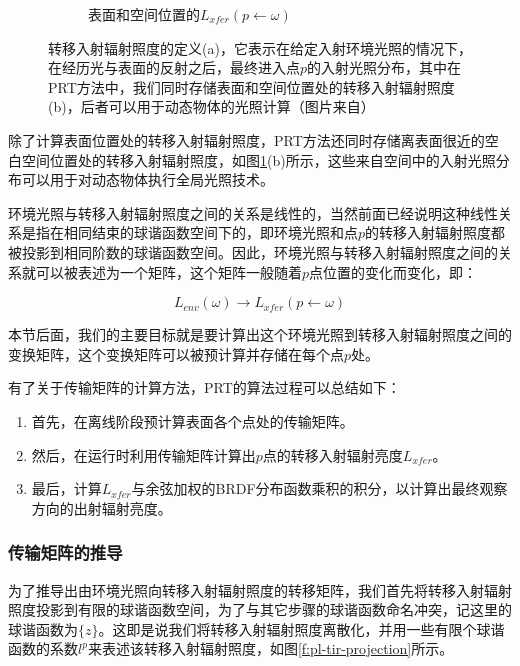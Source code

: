 \begin{figure}
\begin{subfigure}[b]{0.495\textwidth}
			\caption{表面和空间位置的$L_{xfer}(p\leftarrow \omega)$}
	\end{subfigure}
	\caption{转移入射辐射照度的定义(a)，它表示在给定入射环境光照的情况下，在经历光与表面的反射之后，最终进入点$p$的入射光照分布，其中在PRT方法中，我们同时存储表面和空间位置处的转移入射辐射照度(b)，后者可以用于动态物体的光照计算（图片来自\cite{a:PrecomputedRadianceTransfer:TheoryandPractice}）}
	\label{f:pl-transfer-incident-radiance}
\end{figure}

除了计算表面位置处的转移入射辐射照度，PRT方法还同时存储离表面很近的空白空间位置处的转移入射辐射照度，如图\ref{f:pl-transfer-incident-radiance}(b)所示，这些来自空间中的入射光照分布可以用于对动态物体执行全局光照技术。

环境光照与转移入射辐射照度之间的关系是线性的，当然前面已经说明这种线性关系是指在相同结束的球谐函数空间下的，即环境光照和点$p$的转移入射辐射照度都被投影到相同阶数的球谐函数空间。因此，环境光照与转移入射辐射照度之间的关系就可以被表述为一个矩阵，这个矩阵一般随着$p$点位置的变化而变化，即：

\begin{equation}
	L_{env}(\omega)\to L_{xfer}(p\leftarrow\omega)
\end{equation}

本节后面，我们的主要目标就是要计算出这个环境光照到转移入射辐射照度之间的变换矩阵，这个变换矩阵可以被预计算并存储在每个点$p$处。

有了关于传输矩阵的计算方法，PRT的算法过程可以总结如下：

\begin{enumerate}
	\item 首先，在离线阶段预计算表面各个点处的传输矩阵。
	\item 然后，在运行时利用传输矩阵计算出$p$点的转移入射辐射亮度$L_{xfer}$。
	\item 最后，计算$L_{xfer}$与余弦加权的BRDF分布函数乘积的积分，以计算出最终观察方向的出射辐射亮度。
\end{enumerate}



\subsubsection{传输矩阵的推导}
为了推导出由环境光照向转移入射辐射照度的转移矩阵，我们首先将转移入射辐射照度投影到有限的球谐函数空间，为了与其它步骤的球谐函数命名冲突，记这里的球谐函数为$\{z\}$。这即是说我们将转移入射辐射照度离散化，并用一些有限个球谐函数的系数$l^{p}$来表述该转移入射辐射照度，如图\ref{f:pl-tir-projection}所示。

